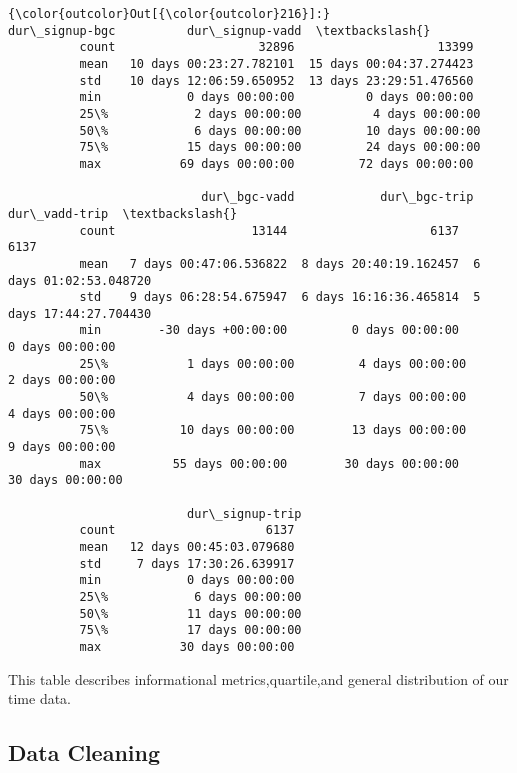 \documentclass[11pt]{article}
\begin{document}
\begin{Verbatim}[commandchars=\\\{\}]
{\color{outcolor}Out[{\color{outcolor}216}]:}                 dur\_signup-bgc          dur\_signup-vadd  \textbackslash{}
          count                    32896                    13399   
          mean   10 days 00:23:27.782101  15 days 00:04:37.274423   
          std    10 days 12:06:59.650952  13 days 23:29:51.476560   
          min            0 days 00:00:00          0 days 00:00:00   
          25\%            2 days 00:00:00          4 days 00:00:00   
          50\%            6 days 00:00:00         10 days 00:00:00   
          75\%           15 days 00:00:00         24 days 00:00:00   
          max           69 days 00:00:00         72 days 00:00:00   
          
                           dur\_bgc-vadd            dur\_bgc-trip           dur\_vadd-trip  \textbackslash{}
          count                   13144                    6137                    6137   
          mean   7 days 00:47:06.536822  8 days 20:40:19.162457  6 days 01:02:53.048720   
          std    9 days 06:28:54.675947  6 days 16:16:36.465814  5 days 17:44:27.704430   
          min        -30 days +00:00:00         0 days 00:00:00         0 days 00:00:00   
          25\%           1 days 00:00:00         4 days 00:00:00         2 days 00:00:00   
          50\%           4 days 00:00:00         7 days 00:00:00         4 days 00:00:00   
          75\%          10 days 00:00:00        13 days 00:00:00         9 days 00:00:00   
          max          55 days 00:00:00        30 days 00:00:00        30 days 00:00:00   
          
                         dur\_signup-trip  
          count                     6137  
          mean   12 days 00:45:03.079680  
          std     7 days 17:30:26.639917  
          min            0 days 00:00:00  
          25\%            6 days 00:00:00  
          50\%           11 days 00:00:00  
          75\%           17 days 00:00:00  
          max           30 days 00:00:00  
\end{Verbatim}
            
    This table describes informational metrics,quartile,and general
distribution of our time data.

    \subsection{Data Cleaning}\label{data-cleaning}
\end{document}
